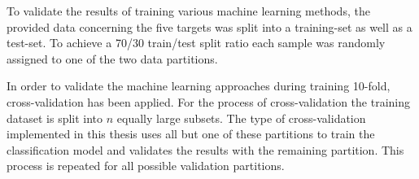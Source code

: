 \label{cha:data_partitioning}
To validate the results of training various machine learning methods, the provided data concerning
the five targets was split into a training-set as well as a test-set. To achieve a 70/30 train/test split ratio each sample was randomly assigned 
to one of the two data partitions\cite[]{Xu2018}.

In order to validate the machine learning approaches during training 10-fold, cross-validation has been applied.
For the process of cross-validation the training dataset is split into $n$ equally large subsets.
The type of cross-validation implemented in this thesis uses all but one of these partitions to train the classification model and validates the 
results with the remaining partition. This process is repeated for all possible validation partitions\cite[]{Molinaro2005}.